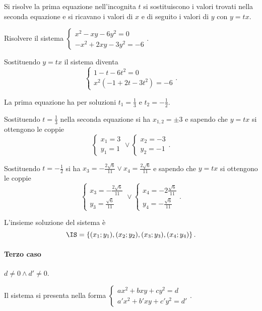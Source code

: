Si risolve la prima equazione nell'incognita $t$ si sostituiscono i valori trovati nella seconda equazione e si ricavano i valori di $x$ e di seguito i valori di $y$ con $y={tx}$.
\newpage
\begin{exrig}
\begin{esempio}
Risolvere il sistema $\left\{\begin{array}{l}x^2-{xy}-6y^2=0 \\-x^2+2{xy}-3y^2=-6 \end{array}\right.$.

Sostituendo $y={tx}$ il sistema diventa 
\[\left\{\begin{array}{l}1-t-6t^2=0 \\x^2(-1+2t-3t^2)=-6 \end{array}\right..\]

La prima equazione ha per soluzioni $t_1=\frac 1 3$ e $t_2=-\frac 1 2$.

Sostituendo $t=\frac 1 3$ nella seconda equazione si ha $x_{1,2}=\pm 3$ e sapendo che $y={tx}$ si ottengono le coppie 
\[\left\{\begin{array}{l}x_1=3\\y_1=1\end{array}\right.\vee\left\{\begin{array}{l}x_2=-3\\y_2=-1\end{array}\right..\]

Sostituendo $t=-\frac 1 2$ si ha $x_3=-\frac{2\sqrt 6}{11}\vee x_4=\frac{2\sqrt 6}{11}$ e sapendo che $y={tx}$ si ottengono le coppie 
\[\left\{\begin{array}{l}x_3=-\frac{2\sqrt 6}{11}\\y_3=\frac{\sqrt 6}{11}\end{array}\right.\vee\left\{\begin{array}{l}x_4=-2\frac{\sqrt 6}{11}\\y_4=-\frac{\sqrt 6}{11}\end{array}\right..\]

L'insieme soluzione del sistema è 
\[\IS=\left\{(x_1;y_1),(x_2;y_2),(x_3;y_3),(x_4;y_4)\right\}.\]
\end{esempio}
\end{exrig}

\paragraph{Terzo caso} $d\neq 0 \wedge d'\neq 0$.

Il sistema si presenta nella forma $\left\{\begin{array}{l}{{ax}^2+{bxy}+{cy}^2=d}\\{a'x^2+b'{xy}+c'y^2=d'}\end{array}\right.$.

